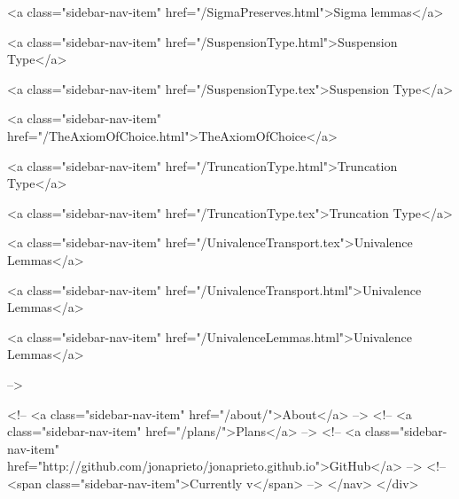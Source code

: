       
    
      
        
          <a class="sidebar-nav-item" href="/SigmaPreserves.html">Sigma lemmas</a>
        
      
    
      
        
          <a class="sidebar-nav-item" href="/SuspensionType.html">Suspension Type</a>
        
      
    
      
        
          <a class="sidebar-nav-item" href="/SuspensionType.tex">Suspension Type</a>
        
      
    
      
        
          <a class="sidebar-nav-item" href="/TheAxiomOfChoice.html">TheAxiomOfChoice</a>
        
      
    
      
        
          <a class="sidebar-nav-item" href="/TruncationType.html">Truncation Type</a>
        
      
    
      
        
          <a class="sidebar-nav-item" href="/TruncationType.tex">Truncation Type</a>
        
      
    
      
        
          <a class="sidebar-nav-item" href="/UnivalenceTransport.tex">Univalence Lemmas</a>
        
      
    
      
        
          <a class="sidebar-nav-item" href="/UnivalenceTransport.html">Univalence Lemmas</a>
        
      
    
      
        
          <a class="sidebar-nav-item" href="/UnivalenceLemmas.html">Univalence Lemmas</a>
        
      
     -->

    <!-- <a class="sidebar-nav-item" href="/about/">About</a> -->
    <!-- <a class="sidebar-nav-item" href="/plans/">Plans</a> -->
    <!-- <a class="sidebar-nav-item" href="http://github.com/jonaprieto/jonaprieto.github.io">GitHub</a> -->
    <!-- <span class="sidebar-nav-item">Currently v</span> -->
  </nav>
</div>


